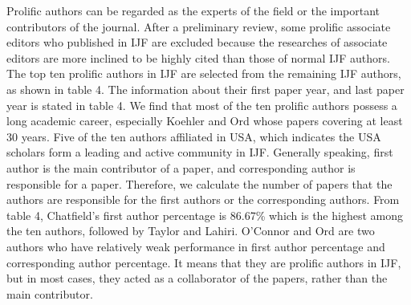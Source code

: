 \documentclass[11pt,a4paper]{elsarticle} %
\begin{document}
Prolific authors can be regarded as the experts of the field or the
important contributors of the journal. After a preliminary review, some
prolific associate editors who published in IJF are excluded because the
researches of associate editors are more inclined to be highly cited
than those of normal IJF authors. The top ten prolific authors in IJF
are selected from the remaining IJF authors, as shown in table 4. The
information about their first paper year, and last paper year is stated
in table 4. We find that most of the ten prolific authors possess a long
academic career, especially Koehler and Ord whose papers covering at
least 30 years. Five of the ten authors affiliated in USA, which
indicates the USA scholars form a leading and active community in IJF.
Generally speaking, first author is the main contributor of a paper, and
corresponding author is responsible for a paper. Therefore, we calculate
the number of papers that the authors are responsible for the first
authors or the corresponding authors. From table 4, Chatfield's first
author percentage is 86.67\% which is the highest among the ten authors,
followed by Taylor and Lahiri. O'Connor and Ord are two authors who have
relatively weak performance in first author percentage and corresponding
author percentage. It means that they are prolific authors in IJF, but
in most cases, they acted as a collaborator of the papers, rather than
the main contributor.

\begin{table}[!htbp]
\centering
\caption{Information about the top ten prolific authors in IJF}
\end{table}
\end{document}
